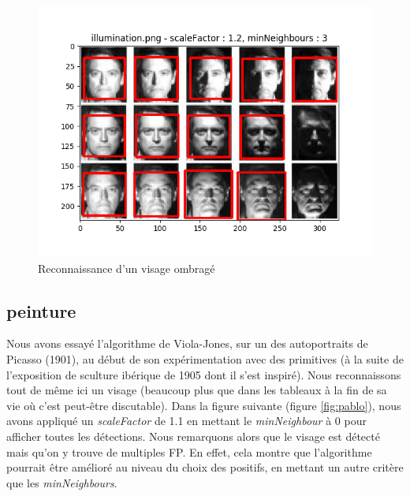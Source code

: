 \documentclass[a4paper,11pt]{article}
\begin{document}
	    \begin{figure}[H]
	        \begin{center}
		   \includegraphics[scale = 0.6]{images/illumination_1,2_3.png}
		   \caption{Reconnaissance d'un visage ombragé}
		   \label{fig:illumination}
	        \end{center}
	    \end{figure}

    \subsection{peinture}

	Nous avons essayé l'algorithme de Viola-Jones, sur un des autoportraits de Picasso (1901), au
	début de son expérimentation avec des primitives (à la suite de l'exposition de sculture
	ibérique de 1905 dont il s'est inspiré). Nous reconnaissons tout de même ici un visage
	(beaucoup plus que dans les tableaux à la fin de sa vie où c'est peut-être discutable).
	Dans la figure suivante (figure \ref{fig:pablo}), nous avons appliqué un
	\textit{scaleFactor} de 1.1 en mettant le \textit{minNeighbour} à 0 pour afficher toutes les
	détections. Nous remarquons alors que le visage est détecté mais qu'on y trouve de multiples
	FP. En effet, cela montre que l'algorithme pourrait être amélioré au niveau du choix des
	positifs, en mettant un autre critère que les \textit{minNeighbours}.

\end{document}
